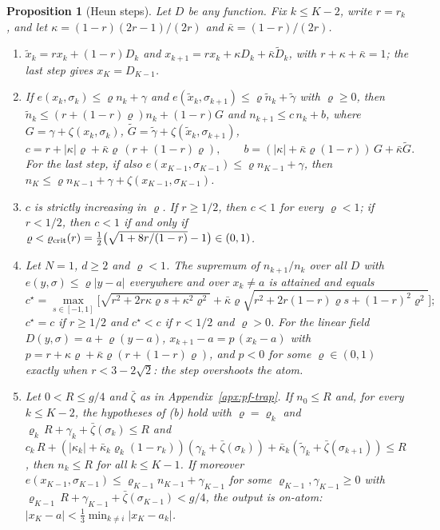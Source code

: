 \documentclass{article} %
\theoremstyle{plain}
\newtheorem{proposition}[theorem]{Proposition}
\theoremstyle{definition}
\theoremstyle{remark}
\begin{document}
\begin{proposition}[Heun steps]
\label{prop:heun}
Let $D$ be any function. Fix $k\le K-2$, write $r=r_k$, and let
$\kappa=(1-r)(2r-1)/(2r)$ and $\bar\kappa=(1-r)/(2r)$.
\begin{enumerate}[label=(\alph*),leftmargin=2em]
\item $\tilde x_k=rx_k+(1-r)D_k$ and $x_{k+1}=rx_k+\kappa D_k+\bar\kappa\tilde D_k$, with
  $r+\kappa+\bar\kappa=1$; the last step gives $x_K=D_{K-1}$.
\item If $e(x_k,\sigma_k)\le\varrho n_k+\gamma$ and $e(\tilde x_k,\sigma_{k+1})\le\varrho\tilde n_k+\tilde\gamma$
  with $\varrho\ge0$, then $\tilde n_k\le(r+(1-r)\varrho)n_k+(1-r)G$ and $n_{k+1}\le c\,n_k+b$, where
  $G=\gamma+\zeta(x_k,\sigma_k)$, $\tilde G=\tilde\gamma+\zeta(\tilde x_k,\sigma_{k+1})$,
  \[
  c=r+|\kappa|\varrho+\bar\kappa\varrho\,(r+(1-r)\varrho),\qquad
  b=(|\kappa|+\bar\kappa\varrho(1-r))\,G+\bar\kappa\tilde G .
  \]
  For the last step, if also $e(x_{K-1},\sigma_{K-1})\le\varrho n_{K-1}+\gamma$, then
  $n_K\le\varrho n_{K-1}+\gamma+\zeta(x_{K-1},\sigma_{K-1})$.
\item $c$ is strictly increasing in $\varrho$. If $r\ge1/2$, then $c<1$ for every $\varrho<1$; if
  $r<1/2$, then $c<1$ if and only if
  $\varrho<\varrho_{\rm crit}(r)=\tfrac12\big(\sqrt{1+8r/(1-r)}-1\big)\in(0,1)$.
\item Let $N=1$, $d\ge2$ and $\varrho<1$. The supremum of $n_{k+1}/n_k$ over all $D$ with
  $e(y,\sigma)\le\varrho|y-a|$ everywhere and over $x_k\ne a$ is attained and equals
  \[
  c^\star=\max_{s\in[-1,1]}\Big[\sqrt{r^2+2r\kappa\varrho s+\kappa^2\varrho^2}
  +\bar\kappa\varrho\sqrt{r^2+2r(1-r)\varrho s+(1-r)^2\varrho^2}\Big];
  \]
  $c^\star=c$ if $r\ge1/2$ and $c^\star<c$ if $r<1/2$ and $\varrho>0$. For the linear field
  $D(y,\sigma)=a+\varrho(y-a)$, $x_{k+1}-a=p\,(x_k-a)$ with $p=r+\kappa\varrho+\bar\kappa\varrho(r+(1-r)\varrho)$,
  and $p<0$ for some $\varrho\in(0,1)$ exactly when $r<3-2\sqrt2$: the step overshoots the atom.
\item Let $0<R\le g/4$ and $\bar\zeta$ as in Appendix~\ref{apx:pf-trap}. If $n_0\le R$ and, for every
  $k\le K-2$, the hypotheses of (b) hold with $\varrho=\varrho_k$ and
  $\varrho_k\,R+\gamma_k+\bar\zeta(\sigma_k)\le R$ and
  $c_k\,R+(|\kappa_k|+\bar\kappa_k\varrho_k(1-r_k))(\gamma_k+\bar\zeta(\sigma_k))+\bar\kappa_k(\tilde\gamma_k+\bar\zeta(\sigma_{k+1}))\le R$,
  then $n_k\le R$ for all $k\le K-1$. If moreover
  $e(x_{K-1},\sigma_{K-1})\le\varrho_{K-1}n_{K-1}+\gamma_{K-1}$ for some $\varrho_{K-1},\gamma_{K-1}\ge0$
  with $\varrho_{K-1}\,R+\gamma_{K-1}+\bar\zeta(\sigma_{K-1})<g/4$, the output is on-atom:
  $|x_K-a|<\tfrac13\min_{k\ne i}|x_K-a_k|$.
\end{enumerate}
\end{proposition}
\end{document}
